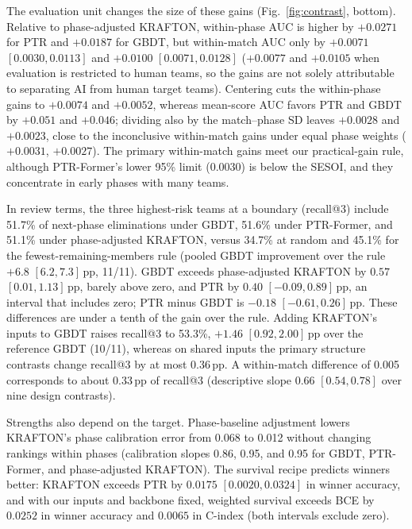 \documentclass[sigconf,anonymous]{acmart}
\begin{document}
The evaluation unit changes the size of these gains (Fig.~\ref{fig:contrast}, bottom). Relative to phase-adjusted KRAFTON, within-phase AUC is higher by $+0.0271$ for PTR and $+0.0187$ for GBDT, but within-match AUC only by $+0.0071$ $[0.0030,\allowbreak 0.0113]$ and $+0.0100$ $[0.0071,\allowbreak 0.0128]$ ($+0.0077$ and $+0.0105$ when evaluation is restricted to human teams, so the gains are not solely attributable to separating AI from human target teams). Centering cuts the within-phase gains to $+0.0074$ and $+0.0052$, whereas mean-score AUC favors PTR and GBDT by $+0.051$ and $+0.046$; dividing also by the match--phase SD leaves $+0.0028$ and $+0.0023$, close to the inconclusive within-match gains under equal phase weights ($+0.0031$, $+0.0027$). The primary within-match gains meet our practical-gain rule, although PTR-Former's lower 95\% limit (0.0030) is below the SESOI, and they concentrate in early phases with many teams.

In review terms, the three highest-risk teams at a boundary (recall@3) include 51.7\% of next-phase eliminations under GBDT, 51.6\% under PTR-Former, and 51.1\% under phase-adjusted KRAFTON, versus 34.7\% at random and 45.1\% for the fewest-remaining-members rule (pooled GBDT improvement over the rule $+6.8$ $[6.2,\allowbreak 7.3]$\,pp, 11/11). GBDT exceeds phase-adjusted KRAFTON by $0.57$ $[0.01,\allowbreak 1.13]$\,pp, barely above zero, and PTR by $0.40$ $[-0.09,\allowbreak 0.89]$\,pp, an interval that includes zero; PTR minus GBDT is $-0.18$ $[-0.61,\allowbreak 0.26]$\,pp. These differences are under a tenth of the gain over the rule. Adding KRAFTON's inputs to GBDT raises recall@3 to 53.3\%, $+1.46$ $[0.92,\allowbreak 2.00]$\,pp over the reference GBDT (10/11), whereas on shared inputs the primary structure contrasts change recall@3 by at most 0.36\,pp. A within-match difference of 0.005 corresponds to about 0.33\,pp of recall@3 (descriptive slope 0.66 $[0.54,\allowbreak 0.78]$ over nine design contrasts).

Strengths also depend on the target. Phase-baseline adjustment lowers KRAFTON's phase calibration error from 0.068 to 0.012 without changing rankings within phases (calibration slopes 0.86, 0.95, and 0.95 for GBDT, PTR-Former, and phase-adjusted KRAFTON). The survival recipe predicts winners better: KRAFTON exceeds PTR by $0.0175$ $[0.0020,\allowbreak 0.0324]$ in winner accuracy, and with our inputs and backbone fixed, weighted survival exceeds BCE by $0.0252$ in winner accuracy and $0.0065$ in C-index (both intervals exclude zero).
\end{document}
